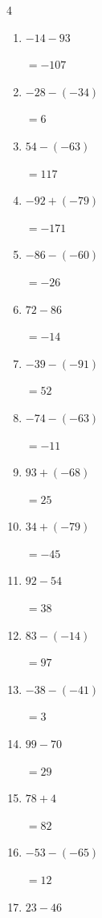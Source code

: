 \begin{multicols}{4}
\begin{enumerate}
  \item $-14-93$

        $=-107$

  \item $-28-(-34)$

        $=6$

  \item $54-(-63)$

        $=117$

  \item $-92+(-79)$

        $=-171$

  \item $-86-(-60)$

        $=-26$

\columnbreak %

  \item $72-86$

        $=-14$

  \item $-39-(-91)$

        $=52$

  \item $-74-(-63)$

        $=-11$

  \item $93+(-68)$

        $=25$

  \item $34+(-79)$

        $=-45$

  \item $92-54$

        $=38$

  \item $83-(-14)$

        $=97$

  \item $-38-(-41)$

        $=3$

  \item $99-70$

        $=29$

  \item $78+4$

        $=82$

  \item $-53-(-65)$

        $=12$

  \item $23-46$


\end{enumerate}
\end{multicols}

